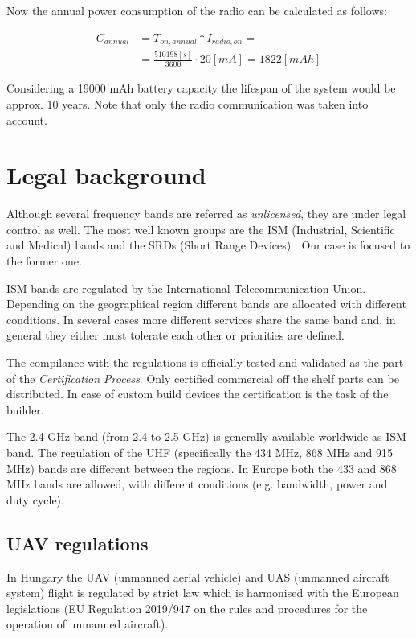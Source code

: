 \documentclass[conference]{IEEEtran}
\begin{document}
Now the annual power consumption of the radio can be calculated as
follows:

\begin{align}
    C_{annual} &= T_{on,annual} * I_{radio,on} = \\
     &= \frac{510198 [s]}{3600} \cdot 20 [mA] = 1822 [mAh]
\end{align}

Considering a 19000 mAh battery capacity the lifespan of the system would
be approx. 10 years. Note that only the radio communication was taken into account.

\section{Legal background}

Although several frequency bands are referred as \emph{unlicensed}, they are
under legal control as well. The most well known groups are the ISM (Industrial,
Scientific and Medical) bands and the SRDs (Short Range Devices) \cite{loy2005}. Our case
is focused to the former one.

ISM bands are regulated by the International Telecommunication Union. Depending
on the geographical region different bands are allocated with different conditions.
In several cases more different services share the same band and, in general
they either must tolerate each other or priorities are defined.

The compilance with the regulations is officially tested and validated as the
part of the \emph{Certification Process}. Only certified commercial off the
shelf parts can be distributed. In case of custom build devices the certification
is the task of the builder.

The 2.4 GHz band (from 2.4 to 2.5 GHz) is generally available worldwide as
ISM band. The regulation of the UHF (specifically the 434 MHz, 868 MHz and 915 MHz)
bands are different between the regions. In Europe both the 433 and 868 MHz bands
are allowed, with different conditions (e.g. bandwidth, power and duty cycle).

\subsection{UAV regulations}

In Hungary the UAV (unmanned aerial vehicle) and UAS (unmanned aircraft system)
flight is regulated by strict law which is harmonised with the European
legislations (EU Regulation 2019/947 on the rules and procedures for the
operation of unmanned aircraft). \cite{eurlex}
\end{document}
